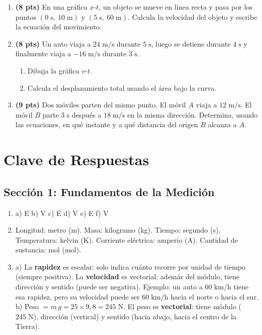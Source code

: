 \documentclass[12pt, letterpaper]{article}
\begin{document}
\begin{enumerate}[leftmargin=*]
  \item \textbf{(8 pts)} En una gráfica $x$-$t$, un objeto se mueve en línea recta y pasa por los puntos $(0\;\text{s},\ 10\;\text{m})$ y $(5\;\text{s},\ 60\;\text{m})$. Calcula la velocidad del objeto y escribe la ecuación del movimiento.

  \item \textbf{(8 pts)} Un auto viaja a $24\;\text{m/s}$ durante $5\;\text{s}$, luego se detiene durante $4\;\text{s}$ y finalmente viaja a $-16\;\text{m/s}$ durante $3\;\text{s}$.
        \begin{enumerate}[label=\alph*)]
          \item Dibuja la gráfica $v$-$t$.
          \item Calcula el desplazamiento total usando el área bajo la curva.
        \end{enumerate}

  \item \textbf{(9 pts)} Dos móviles parten del mismo punto. El móvil $A$ viaja a $12\;\text{m/s}$. El móvil $B$ parte $3\;\text{s}$ después a $18\;\text{m/s}$ en la misma dirección. Determina, usando las ecuaciones, en qué instante y a qué distancia del origen $B$ alcanza a $A$.
\end{enumerate}

\newpage

\ifmwclaves
  \section{Clave de Respuestas}

  \subsection*{Sección 1: Fundamentos de la Medición}

  \begin{enumerate}[leftmargin=*, label=\textbf{\arabic*.}]
    \item a) E \quad b) V \quad c) E \quad d) V \quad e) E \quad f) V

    \item Longitud: metro (m). Masa: kilogramo (kg). Tiempo: segundo (s). Temperatura: kelvin (K). Corriente eléctrica: amperio (A). Cantidad de sustancia: mol (mol).

    \item a) La \textbf{rapidez} es escalar: solo indica cuánto recorre por unidad de tiempo (siempre positiva). La \textbf{velocidad} es vectorial: además del módulo, tiene dirección y sentido (puede ser negativa). Ejemplo: un auto a $60\;\text{km/h}$ tiene esa rapidez, pero su velocidad puede ser $60\;\text{km/h}$ hacia el norte o hacia el sur.
          \\[2pt]
          b) Peso $= m\,g = 25 \times 9{,}8 = 245\;\text{N}$. El peso es \textbf{vectorial}: tiene módulo ($245\;\text{N}$), dirección (vertical) y sentido (hacia abajo, hacia el centro de la Tierra).
  \end{enumerate}
\end{document}
